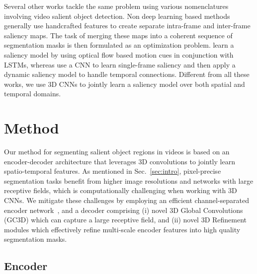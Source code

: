 \documentclass{bmvc2k_arxiv}
\newcommand{\PAR}[1]{\vskip4pt \noindent {\bf #1~}}
\begin{document}
\PAR{Video Salient Object Detection}
Several other works tackle the same problem using various nomenclatures involving video salient object detection. Non deep learning based methods~\cite{Fang14TIP,Wang15CVPR,Wang15TIP,Liu17TCSVT} generally use handcrafted features to create separate intra-frame and inter-frame saliency maps. The task of merging these maps into a coherent sequence of segmentation masks is then formulated as an optimization problem. \cite{Li18CVPR_FGRN} learn a saliency model by using optical flow based motion cues in conjunction with LSTMs, whereas \cite{Wang18TIP} use a CNN to learn single-frame saliency and then apply a dynamic saliency model to handle temporal connections.
Different from all these works, we use 3D CNNs to jointly learn a saliency model over both spatial and temporal domains. 
\section{Method}
\label{sec:method}

Our method for segmenting salient object regions in videos is based on an encoder-decoder architecture that leverages 3D convolutions to jointly learn spatio-temporal features. As mentioned in Sec.~\ref{sec:intro}, pixel-precise segmentation tasks benefit from higher image resolutions and networks with large receptive fields, which is computationally challenging when working with 3D CNNs.
We mitigate these challenges by employing an efficient channel-separated encoder network~\cite{Tran19ICCV}, and a decoder comprising (i) novel 3D Global Convolutions (GC3D) which can capture a large receptive field, and (ii) novel 3D Refinement modules which effectively refine multi-scale encoder features into high quality segmentation masks.


\subsection{Encoder}
\label{sec:encoder}
\end{document}
